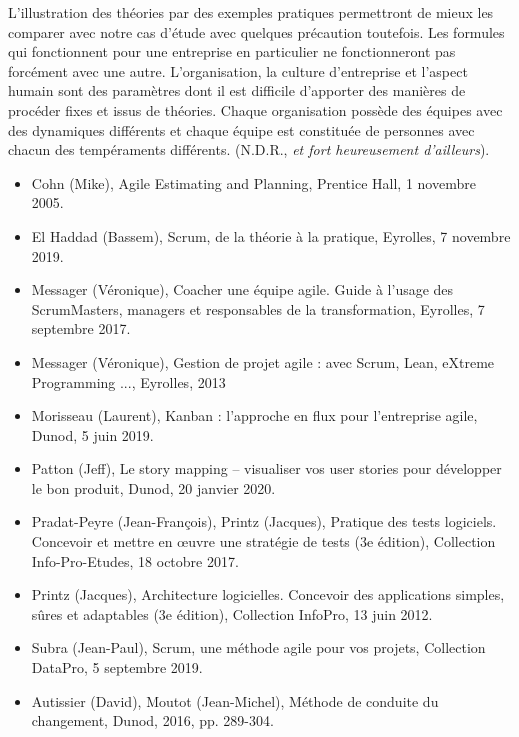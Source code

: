 L'illustration des théories par des exemples pratiques permettront de mieux les comparer avec notre cas d'étude avec quelques précaution toutefois. Les formules qui fonctionnent pour une entreprise en particulier ne fonctionneront pas forcément avec une autre. L'organisation, la culture d'entreprise et l'aspect humain sont des paramètres dont il est difficile d'apporter des manières de procéder fixes et issus de théories. Chaque organisation possède des équipes avec des dynamiques différents et chaque équipe est constituée de personnes avec chacun des tempéraments différents. (N.D.R., \textit{et fort heureusement d'ailleurs}).
\begin{itemize}
\item Cohn (Mike), Agile Estimating and Planning, Prentice Hall, 1 novembre 2005.
\item El Haddad (Bassem), Scrum, de la théorie à la pratique, Eyrolles, 7 novembre 2019. 
\item Messager (Véronique), Coacher une équipe agile. Guide à l’usage des ScrumMasters, managers et responsables de la transformation, Eyrolles, 7 septembre 2017. 
\item Messager (Véronique), Gestion de projet agile : avec Scrum, Lean, eXtreme Programming ..., Eyrolles, 2013
\item Morisseau (Laurent), Kanban : l’approche en flux pour l’entreprise agile, Dunod, 5 juin 2019.
\item Patton (Jeff), Le story mapping – visualiser vos user stories pour développer le bon produit, Dunod, 20 janvier 2020. 
\item Pradat-Peyre (Jean-François), Printz (Jacques), Pratique des tests logiciels. Concevoir et mettre en œuvre une stratégie de tests (3e édition), Collection Info-Pro-Etudes, 18 octobre 2017. 
\item Printz (Jacques), Architecture logicielles. Concevoir des applications simples, sûres et adaptables (3e édition), Collection InfoPro, 13 juin 2012. 
\item Subra (Jean-Paul), Scrum, une méthode agile pour vos projets, Collection DataPro, 5 septembre 2019.
\item Autissier (David), Moutot (Jean-Michel), Méthode de conduite du changement, Dunod, 2016, pp. 289-304. 
\end{itemize}


 
